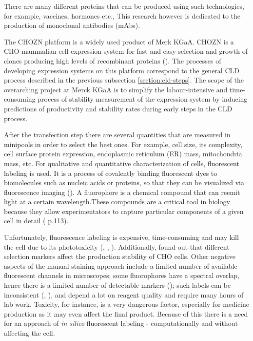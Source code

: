 There are many different proteins that can be produced using such technologies, for example, vaccines, hormones etc., This research however is dedicated to the production of monoclonal antibodies (mAbs). 

The CHOZN\raisebox{1ex}{\small{\textregistered}} platform is a widely used product of Merk KGaA. CHOZN\raisebox{1ex}{\small{\textregistered}} is a CHO mammalian cell expression system for fast and easy selection and growth of clones producing high levels of recombinant proteins (\cite{chozn}). The processes of developing expression systems on this platform correspond to the general CLD process described in the previous subsection \ref{section:cld-steps}. The scope of the overarching project at Merck KGaA is to simplify the labour-intensive and time-consuming process of stability measurement of the expression system by inducing predictions of productivity and stability rates during early steps in the CLD process. 

After the transfection step there are several quantities that are measured in minipools in order to select the best ones. For example, cell size, its complexity, cell surface protein expression, endoplasmic reticulum (ER) mass, mitochondria mass, etc. For qualitative and quantitative characterization of cells, fluorescent labeling is used. It is a process of covalently binding fluorescent dyes to biomolecules such as nucleic acids or proteins, so that they can be visualized via fluorescence imaging (\cite{fluorescent_labeling}). A fluorophore is a chemical compound that can reemit light at a certain wavelength.These compounds are a critical tool in biology because they allow experimentators to capture particular components of a given cell in detail (\cite{DL_for_LS} p.113). 

Unfortunately, fluorescence labeling is expensive, time-consuming and may kill the cell due to its phototoxicity (\cite{Fried_1982}, \cite{Patil_2018}, \cite{Progatzky_2013}). Additionally, \cite{Yeo_2017} found out that different selection markers affect the production stability of CHO cells. Other negative aspects of the manual staining approach include a limited number of available fluorescent channels in microscopes; some fluorophores have a spectral overlap, hence there is a limited number of detectable markers (\cite{Perfetto_2004}); such labels can be inconsistent (\cite{Burry_2011}, \cite{Weigert_1970}), and depend a lot on reagent quality and require many hours of lab work. Toxicity, for instance, is a very dangerous factor, especially for medicine production as it may even affect the final product. Because of this there is a need for an approach of \textit{in silico} fluorescent labeling - computationally and without affecting the cell. 

